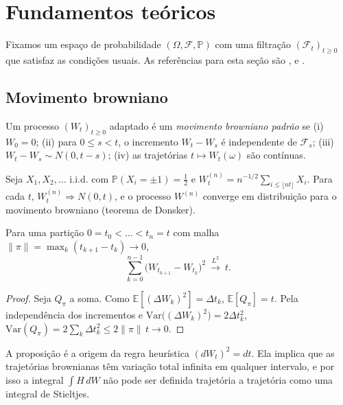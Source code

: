 \section{Fundamentos teóricos}

Fixamos um espaço de probabilidade $(\Omega,\mathcal F,\mathbb P)$ com uma filtração $(\mathcal F_t)_{t\ge0}$ que satisfaz as condições usuais. As referências para esta seção são \citet{shreve2004b}, \citet{karatzasshreve1991} e \citet{oksendal2003}.

\subsection{Movimento browniano}

\begin{definicao}
Um processo $(W_t)_{t\ge0}$ adaptado é um \emph{movimento browniano padrão} se (i) $W_0=0$; (ii) para $0\le s<t$, o incremento $W_t-W_s$ é independente de $\mathcal F_s$; (iii) $W_t-W_s\sim N(0,t-s)$; (iv) as trajetórias $t\mapsto W_t(\omega)$ são contínuas.
\end{definicao}

\begin{proposicao}
Seja $X_1,X_2,\dots$ i.i.d. com $\mathbb P(X_i=\pm1)=\tfrac12$ e $W^{(n)}_t=n^{-1/2}\sum_{i\le\lfloor nt\rfloor}X_i$. Para cada $t$, $W^{(n)}_t\Rightarrow N(0,t)$, e o processo $W^{(n)}$ converge em distribuição para o movimento browniano (teorema de Donsker).
\end{proposicao}

\begin{proposicao}\label{prop:vq}
Para uma partição $0=t_0<\dots<t_n=t$ com malha $\|\pi\|=\max_k(t_{k+1}-t_k)\to0$,
\begin{equation}
\sum_{k=0}^{n-1}\big(W_{t_{k+1}}-W_{t_k}\big)^2\ \xrightarrow{L^2}\ t.
\end{equation}
\end{proposicao}

\begin{proof}
Seja $Q_\pi$ a soma. Como $\mathbb E[(\Delta W_k)^2]=\Delta t_k$, $\mathbb E[Q_\pi]=t$. Pela independência dos incrementos e $\mathrm{Var}\big((\Delta W_k)^2\big)=2\Delta t_k^2$, $\mathrm{Var}(Q_\pi)=2\sum_k\Delta t_k^2\le2\|\pi\|\,t\to0$.
\end{proof}

A proposição é a origem da regra heurística $(dW_t)^2=dt$. Ela implica que as trajetórias brownianas têm variação total infinita em qualquer intervalo, e por isso a integral $\int H\,dW$ não pode ser definida trajetória a trajetória como uma integral de Stieltjes.

